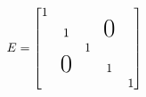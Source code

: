 \documentclass{book}
\begin{document}
\setcounter{chapter}{3}

\begin{equation}
E=\begin{bmatrix}
1\\
& 1 & & \text{{\huge{0}}}\\
& & 1\\
& \text{{\huge{0}}} & & 1\\
& & & & 1
\end{bmatrix}
\end{equation}
\end{document}
